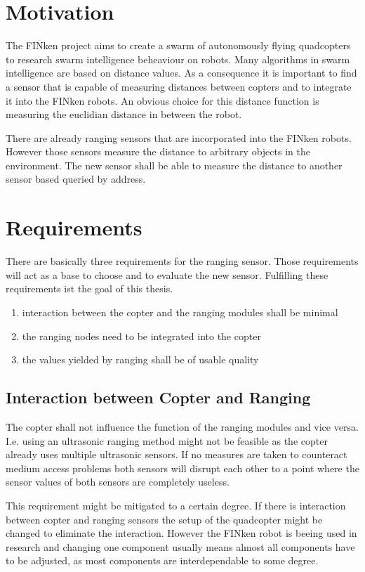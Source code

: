 \section{Motivation}

The FINken project aims to create a swarm of autonomously flying quadcopters to research swarm intelligence beheaviour on robots.
Many algorithms in swarm intelligence are based on distance values.
As a consequence it is important to find a sensor that is capable of measuring distances between copters and to integrate it into the FINken robots.
An obvious choice for this distance function is measuring the euclidian distance in between the robot.

There are already ranging sensors that are incorporated into the FINken robots.
However those sensors measure the distance to arbitrary objects in the environment.
The new sensor shall be able to measure the distance to another sensor based queried by address.

\section{Requirements}
\label{req}
There are basically three requirements for the ranging sensor.
Those requirements will act as a base to choose and to evaluate the new sensor.
Fulfilling these requirements ist the goal of this thesis.

\begin{enumerate}
	\item interaction between the copter and the ranging modules shall be minimal
	\item the ranging nodes need to be integrated into the copter
	\item the values yielded by ranging shall be of usable quality
\end{enumerate}

\subsection{Interaction between Copter and Ranging}
\label{req1}
The copter shall not influence the function of the ranging modules and vice versa.
I.e. using an ultrasonic ranging method might not be feasible as the copter already uses multiple ultrasonic sensors.
If no measures are taken to counteract medium access problems both sensors will disrupt each other to a point where the sensor values of both sensors are completely useless.

This requirement might be mitigated to a certain degree.
If there is interaction between copter and ranging sensors the setup of the quadcopter might be changed to eliminate the interaction.
However the FINken robot is beeing used in research and changing one component usually means almost all components have to be adjusted, as most components are interdependable to some degree.

